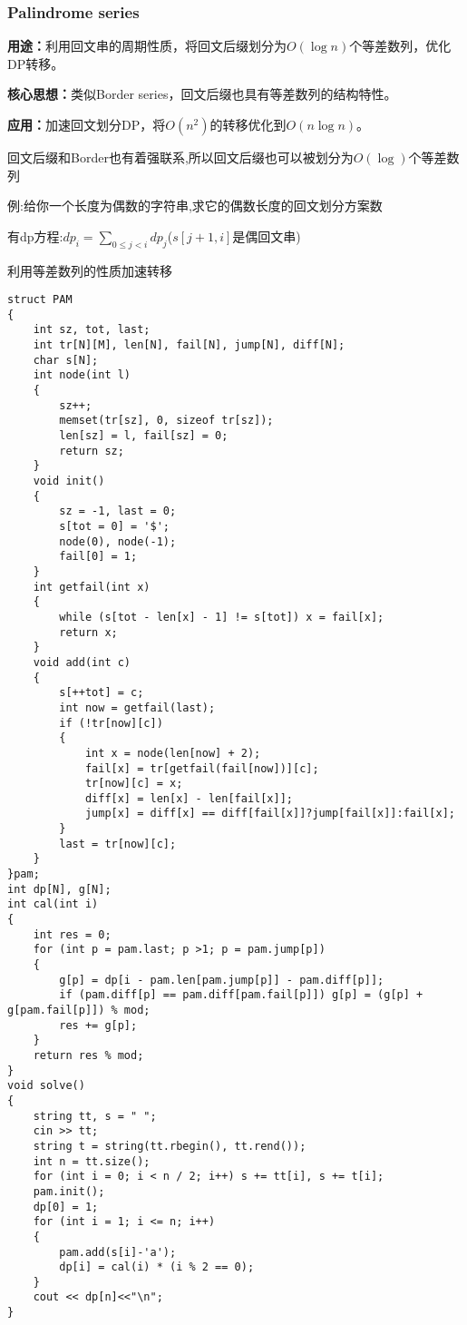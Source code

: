 \documentclass[a4paper, fontset=none]{ctexart}
\begin{document}
\subsubsection{Palindrome series}
\textbf{用途：}利用回文串的周期性质，将回文后缀划分为$O(\log n)$个等差数列，优化DP转移。

\textbf{核心思想：}类似Border series，回文后缀也具有等差数列的结构特性。

\textbf{应用：}加速回文划分DP，将$O(n ^ 2)$的转移优化到$O(n\log n)$。

回文后缀和Border也有着强联系,所以回文后缀也可以被划分为$O(\log)$个等差数列

例:给你一个长度为偶数的字符串,求它的偶数长度的回文划分方案数

有dp方程:$dp_i=\sum\limits_{0\leqslant j < i}dp_j$($s[j+1, i]$是偶回文串)

利用等差数列的性质加速转移

\begin{verbatim}
struct PAM
{
    int sz, tot, last;
    int tr[N][M], len[N], fail[N], jump[N], diff[N];
    char s[N];
    int node(int l)
    {
        sz++;
        memset(tr[sz], 0, sizeof tr[sz]);
        len[sz] = l, fail[sz] = 0;
        return sz;
    }
    void init()
    {
        sz = -1, last = 0;
        s[tot = 0] = '$';
        node(0), node(-1);
        fail[0] = 1;
    }
    int getfail(int x)
    {
        while (s[tot - len[x] - 1] != s[tot]) x = fail[x];
        return x;
    }
    void add(int c)
    {
        s[++tot] = c;
        int now = getfail(last);
        if (!tr[now][c])
        {
            int x = node(len[now] + 2);
            fail[x] = tr[getfail(fail[now])][c];
            tr[now][c] = x;
            diff[x] = len[x] - len[fail[x]];
            jump[x] = diff[x] == diff[fail[x]]?jump[fail[x]]:fail[x];
        }
        last = tr[now][c];
    }
}pam;
int dp[N], g[N];
int cal(int i)
{
    int res = 0;
    for (int p = pam.last; p >1; p = pam.jump[p])
    {
        g[p] = dp[i - pam.len[pam.jump[p]] - pam.diff[p]];
        if (pam.diff[p] == pam.diff[pam.fail[p]]) g[p] = (g[p] + g[pam.fail[p]]) % mod;
        res += g[p];
    }
    return res % mod;
}
void solve()
{
    string tt, s = " ";
    cin >> tt;
    string t = string(tt.rbegin(), tt.rend());
    int n = tt.size();
    for (int i = 0; i < n / 2; i++) s += tt[i], s += t[i];
    pam.init();
    dp[0] = 1;
    for (int i = 1; i <= n; i++)
    {
        pam.add(s[i]-'a');
        dp[i] = cal(i) * (i % 2 == 0);
    }
    cout << dp[n]<<"\n";
}
\end{verbatim}
\end{document}

